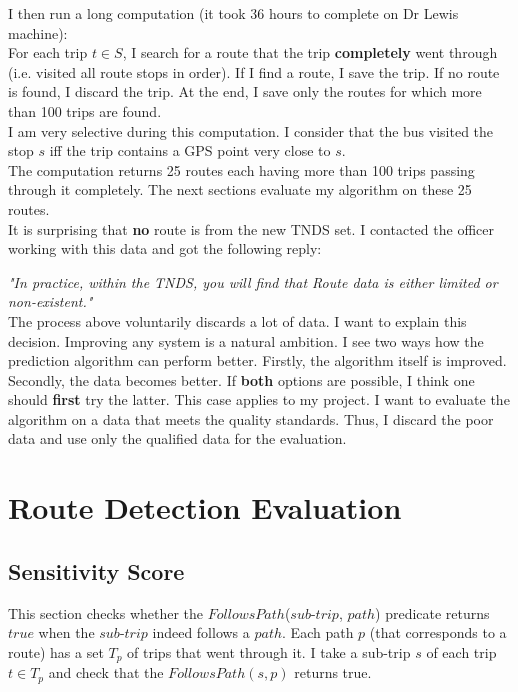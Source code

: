 \documentclass[12pt,a4paper,oneside,openright]{report}
\begin{document}
I then run a long computation (it took 36 hours to complete on Dr Lewis machine): \\

For each trip $t \in S$, I search for a route that the trip \textbf{completely}
went through (i.e. visited all route stops in order). If I find a route, I save the trip. If no route is found, I discard the
trip. At the end, I save only the routes for which more than 100 trips 
are found. \\

I am very selective during this computation. I consider that the bus visited
the stop $s$ iff the trip contains a GPS point very close to $s$. \\

The computation returns 25 routes each having more than 100 trips passing through it completely. The next
sections evaluate my algorithm on these 25 routes. \\

It is surprising that \textbf{no} route is from the new TNDS set. I contacted the officer
working with this data and got the following reply:

\textit{"In practice, within the TNDS, you will find that Route data is either limited or
non-existent."} \\

The process above voluntarily discards a lot of data. I want to explain this decision.
Improving any system is a natural ambition. I see two ways how the prediction algorithm can
perform better. Firstly, the algorithm itself is improved. Secondly, the data becomes better.
If \textbf{both} options are possible, I think one should \textbf{first} try the latter.
This case applies to my project. I want to evaluate the algorithm on a data that meets
the quality standards. Thus, I discard the poor data and use only the qualified data for the
evaluation. \\


\section{Route Detection Evaluation}

\subsection{Sensitivity Score}

This section checks whether the $FollowsPath$($sub$-$trip$, $path$) predicate returns $true$
when the $sub$-$trip$ indeed follows a $path$. Each path $p$ (that corresponds to a route)
has a set $T_p$ of trips that went through it. I take a sub-trip $s$ of each trip $t \in T_p$
and check that the $FollowsPath(s, p)$ returns true. \\
\end{document}
